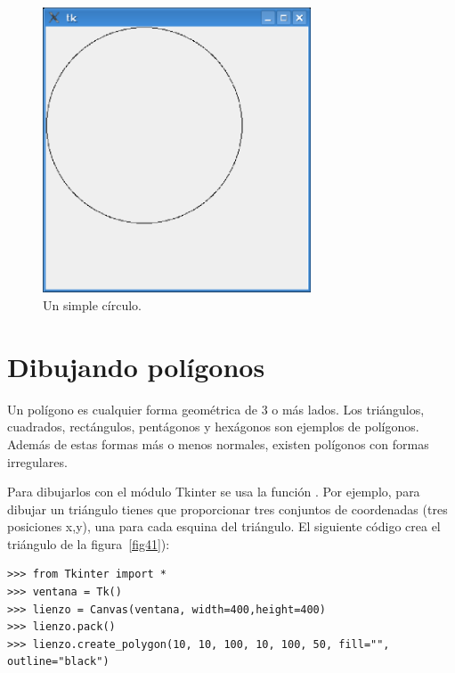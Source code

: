 \begin{figure}
\begin{center}
\includegraphics[width=80mm]{figure40.eps}
\end{center}
\caption{Un simple círculo.}\label{fig40}
\end{figure}

\section{Dibujando polígonos}

Un polígono es cualquier forma geométrica de 3 o más lados. Los triángulos, cuadrados, rectángulos, pentágonos y hexágonos son ejemplos de polígonos.  Además de estas formas más o menos normales, existen polígonos con formas irregulares.

Para dibujarlos con el módulo Tkinter se usa la función . Por ejemplo, para dibujar un triángulo tienes que proporcionar tres conjuntos de coordenadas (tres posiciones x,y), una para cada esquina del triángulo. El siguiente código crea el triángulo de la figura~\ref{fig41}):

\begin{listing}
\begin{verbatim}
>>> from Tkinter import *
>>> ventana = Tk()
>>> lienzo = Canvas(ventana, width=400,height=400)
>>> lienzo.pack()
>>> lienzo.create_polygon(10, 10, 100, 10, 100, 50, fill="", outline="black")
\end{verbatim}
\end{listing}

